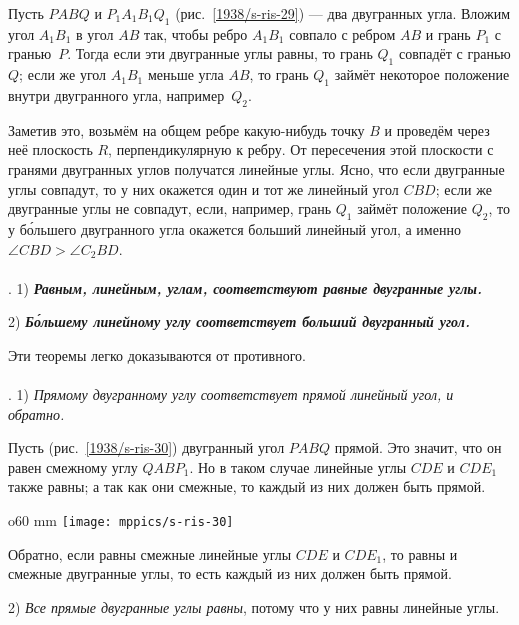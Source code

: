 Пусть $PABQ$ и $P_1A_1B_1Q_1$ (рис.~\ref{1938/s-ris-29}) — два двугранных угла.
Вложим угол $A_1B_1$ в угол $AB$ так, чтобы ребро $A_1B_1$ совпало с ребром $AB$ и грань $P_1$ с гранью~$P$.
Тогда если эти двугранные углы равны, то грань $Q_1$ совпадёт с гранью $Q$;
если же угол $A_1B_1$ меньше угла $AB$, то грань $Q_1$ займёт некоторое положение внутри двугранного угла, например~$Q_2$.


Заметив это, возьмём на общем ребре какую-нибудь точку $B$ и проведём через неё плоскость $R$, перпендикулярную к ребру.
От пересечения этой плоскости с гранями двугранных углов получатся линейные углы.
Ясно, что если двугранные углы совпадут, то у них окажется один и тот же линейный угол $CBD$;
если же двугранные углы не совпадут, если, например, грань $Q_1$ займёт положение $Q_2$, то у б\'{о}льшего двугранного угла окажется больший линейный угол, а именно $\angle CBD > \angle C_2BD$.

\paragraph{}\label{1938/s40}
.
1) \textbf{\emph{Равным, линейным, углам, соответствуют равные двугранные углы.}}

2) \textbf{\emph{Б\'{о}льшему линейному углу соответствует больший двугранный угол.}}

Эти теоремы легко доказываются от противного.

\paragraph{}\label{1938/s41}
. 1) \emph{Прямому двугранному углу соответствует прямой линейный угол, и обратно.}

Пусть (рис.~\ref{1938/s-ris-30}) двугранный угол $PABQ$ прямой.
Это значит, что он равен смежному углу $QABP_1$.
Но в таком случае линейные углы $CDE$ и $CDE_1$ также равны;
а так как они смежные, то каждый из них должен быть прямой.

\begin{wrapfigure}{o}{60 mm}
\centering
\texttt{[image: mppics/s-ris-30]}
\caption{}\label{1938/s-ris-30}
\end{wrapfigure}

Обратно, если равны смежные линейные углы $CDE$ и $CDE_1$, то равны и смежные двугранные углы, то есть каждый из них должен быть прямой.

2) \emph{Все прямые двугранные углы равны}, потому что у них равны линейные углы.

